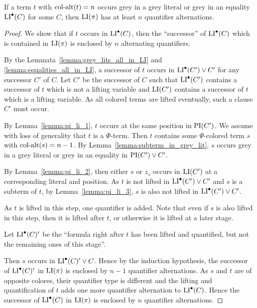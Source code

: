 \documentclass[,%
	draft=false,%
	numbers=noendperiod
	12pt,
	a4paper,
	oneside,%
	openany,
]{memoir}
\begin{document}
\begin{clemma}
	If a term $t$ with $\operatorname{col-alt}(t)=n$ occurs grey in a grey literal or grey in an equality $\operatorname{LI}^\bullet(C)$ for some $C$, then $\operatorname{LI}(\pi)$ has at least $n$ quantifier alternations.
\end{clemma}
\begin{proof}
	We show that if $t$ occurs in $\operatorname{LI}^\bullet(C)$, then the ``successor'' of $\operatorname{LI}^\bullet(C)$ which is contained in $\operatorname{LI}(\pi)$ is enclosed by $n$ alternating quantifiers. 

	By the Lemmata~\ref{lemma:grey_lits_all_in_LI} and \ref{lemma:equalities_all_in_LI}, a successor of $t$ occurs in $\operatorname{LI}^\bullet(C') \lor C'$ for any successor $C'$ of $C$.
	Let $C'$ be the successor of $C$ such that $\operatorname{LI}^\bullet(C')$ contains a successor of $t$ which is not a lifting variable and $\operatorname{LI}(C')$ contains a successor of $t$ which is a lifting variable.
	As all colored terms are lifted eventually, such a clause $C'$ must occur.

	By Lemma~\ref{lemma:pi_li_1}, $t$ occurs at the same position in $\operatorname{PI}(C')$.
	We assume with loss of generality that $t$ is a $\Phi$-term.
	Then $t$ contains some $\Psi$-colored term $s$ with $\operatorname{col-alt}(s) = n-1$.
	By Lemma~\ref{lemma:subterm_in_grey_lit}, $s$ occurs grey in a grey literal or grey in an equality in $\operatorname{PI}(C')\lor C'$.

	By Lemma~\ref{lemma:pi_li_2}, then either $s$ or $z_s$ occurs in $\operatorname{LI}(C')$  at a corresponding literal and position. 
	As $t$ is not lifted in $\operatorname{LI}^\bullet(C') \lor C'$ and $s$ is a subterm of $t$, by Lemma~\ref{lemma:pi_li_3}, $s$ is also not lifted in $\operatorname{LI}^\bullet(C') \lor C'$.

	As $t$ is lifted in this step, one quantifier is added.
	Note that even if $s$ is also lifted in this step, then it is lifted after $t$, or otherwise it is lifted at a later stage.

	Let $\operatorname{LI}^\bullet(C)'$ be the ``formula right after $t$ has been lifted and quantified, but not the remaining ones of this stage''.

	Then $s$ occurs in $\operatorname{LI}^\bullet(C)' \lor C$.
	Hence by the induction hypothesis, the successor of $\operatorname{LI}^\bullet(C)'$ in $\operatorname{LI}(\pi)$ is enclosed by $n-1$ quantifier alternations.
	As $s$ and $t$ are of opposite colores, their quantifier type is different and the lifting and quantification of $t$ adds one more quantifier alternation to $\operatorname{LI}^\bullet(C)$. 
	Hence the successor of $\operatorname{LI}^\bullet(C)$ in $\operatorname{LI}(\pi)$ is enclosed by $n$ quantifier alternations.

\end{proof}
\end{document}
